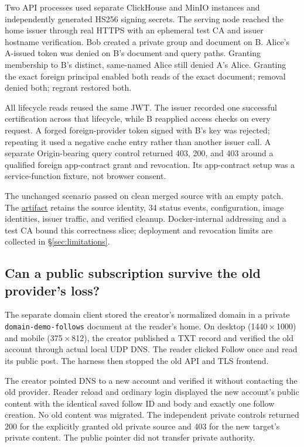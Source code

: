 \documentclass[sigconf, nonacm]{acmart}
\newcommand{\artifactbase}{https://github.com/jacoby149/web10}
\newcommand{\domainartifactrev}{26720acba859c7eb03fc5d26a6221cdde5b764a1}
\newcommand{\evidence}[2]{\href{\artifactbase/tree/\domainartifactrev/#1}{#2}}
\begin{document}
Two API processes used separate ClickHouse and MinIO instances and
independently generated HS256 signing secrets. The serving node reached
the home issuer through real HTTPS with an ephemeral test CA and issuer
hostname verification. Bob created a private group and document on B.
Alice's A-issued token was denied on B's document and query paths.
Granting membership to B's distinct, same-named Alice still denied
A's Alice. Granting the exact foreign principal enabled both reads of
the exact document; removal denied both; regrant restored both.

All lifecycle reads reused the same JWT. The issuer recorded one
successful certification across that lifecycle, while B reapplied access
checks on every request. A forged foreign-provider token signed with
B's key was rejected; repeating it used a negative cache entry rather
than another issuer call. A separate Origin-bearing query control
returned 403, 200, and 403 around a qualified foreign app-contract grant
and revocation. Its app-contract setup was a service-function fixture,
not browser consent.

The unchanged scenario passed on clean merged source with an empty
patch. The \evidence{research/federation-demo}{artifact} retains the
source identity, 34 status events, configuration, image identities,
issuer traffic, and verified cleanup. Docker-internal addressing and a
test CA bound this correctness slice; deployment and revocation limits
are collected in \S\ref{sec:limitations}.

\subsection{Can a public subscription survive the old provider's loss?}
\label{sec:ev-domain}

The separate domain client stored the creator's normalized domain in a
private \texttt{domain-demo-follows} document at the reader's home.
On desktop (1440\,$\times$\,1000) and mobile (375\,$\times$\,812), the
creator published a TXT record and verified the old account through
actual local UDP DNS. The reader clicked Follow once and read its
public post. The harness then stopped the old API and TLS frontend.

The creator pointed DNS to a new account and verified it without
contacting the old provider. Reader reload and ordinary login displayed
the new account's public content with the identical saved follow ID and
body and exactly one follow creation. No old content was migrated.
The independent private controls returned 200 for the explicitly granted
old private source and 403 for the new target's private content. The
public pointer did not transfer private authority.
\end{document}
